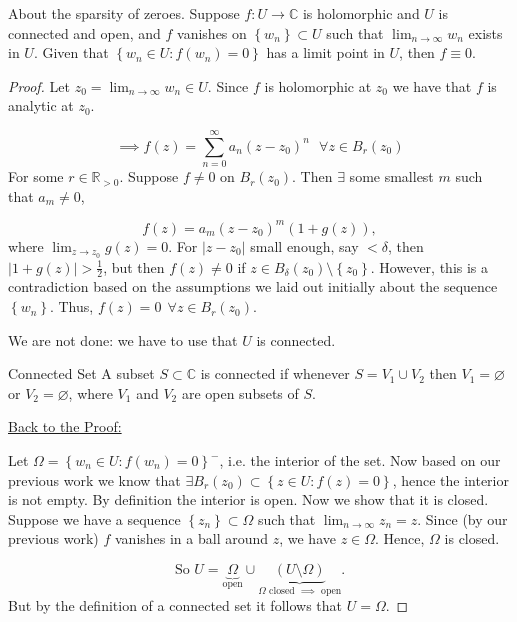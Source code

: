 \documentclass{article}
\begin{document}
\begin{thrm}{About the sparsity of zeroes.}{}
Suppose \( f: U \to \mathbb{C}  \) is holomorphic and  \( U \) is connected and open, and \( f \) vanishes on \( \left\{ w_{n}  \right\}  \subset U\) such that \( \lim_{n \to \infty} w_{n}  \) exists in \( U \). Given that \(\left\{ w_{n} \in U : f(w_{n} ) = 0\right\}  \) has a limit point in \( U \), then \( f \equiv 0 \).  

\tcbline 

\begin{proof}
Let \( z_0 = \lim_{n \to \infty} w_{n}  \in  U\). Since \( f \) is holomorphic at \( z_0 \) we have that \( f \) is analytic at \( z_0 \). 

\[
    \implies f(z) = \sum_{n= 0 }^{\infty} a_{n} (z - z_0)^n \ \ \ \forall z\in B_r(z_0)
\]
For some \( r\in \mathbb{R} _{>0} \). Suppose \( f \neq 0 \) on \( B_r(z_0) \). Then \( \exists  \) some smallest \( m \) such that \( a_{m} \neq 0  \),

\[
    f(z) = a_{m} (z - z_0)^m (1 + g(z)),
\]
where \( \lim_{z \to z_0} g(z) = 0 \). For \( \left\lvert z - z_0 \right\rvert  \) small enough, say \( <\delta  \), then \( \left\lvert 1 + g(z) \right\rvert  > \frac{1}{2}\), but then \( f(z) \neq 0  \) if \( z \in B_\delta (z_0) \setminus \left\{ z_0 \right\}   \). However, this is a contradiction based on the assumptions we laid out initially about the sequence \( \left\{ w_{n}  \right\}  \). Thus, \( f(z) = 0 \ \ \forall z \in B_r(z_0)  \). 

We are not done: we have to use that \( U \) is connected.

\begin{defn}{Connected Set}{}
A subset \( S \subset \mathbb{C}  \) is connected if whenever \( S = V_1 \cup V_2 \) then \( V_1 = \varnothing  \) or \( V_2 = \varnothing  \), where \( V_1 \) and \( V_2 \) are open subsets of \( S \). 
\end{defn}

\underline{Back to the Proof:}

Let \( \Omega = \left\{ w_{n} \in U : f(w_{n} ) = 0\right\}^-  \), i.e. the interior of the set. Now based on our previous work we know that \(\exists B_r(z_0) \subset \left\{ z \in U: f(z) = 0 \right\}   \), hence the interior is not empty. By definition the interior is open. Now we show that it is closed. Suppose we have a sequence \( \left\{ z_{n}  \right\}  \subset \Omega \)  such that \( \lim_{n \to \infty} z_{n} = z  \). Since (by our previous work) \( f \) vanishes in a ball around \( z \), we have \( z \in \Omega  \). Hence, \( \Omega  \) is closed. 

\[
    \text{So } U = \underbrace{\Omega }_{\text{open} } \cup   \underbrace{(U \setminus \Omega ) }_{\Omega \text{ closed } \implies  \text{ open} } .
\]
But by the definition of a connected set it follows that \( U = \Omega  \). 
\end{proof}

\end{thrm}
\end{document}
